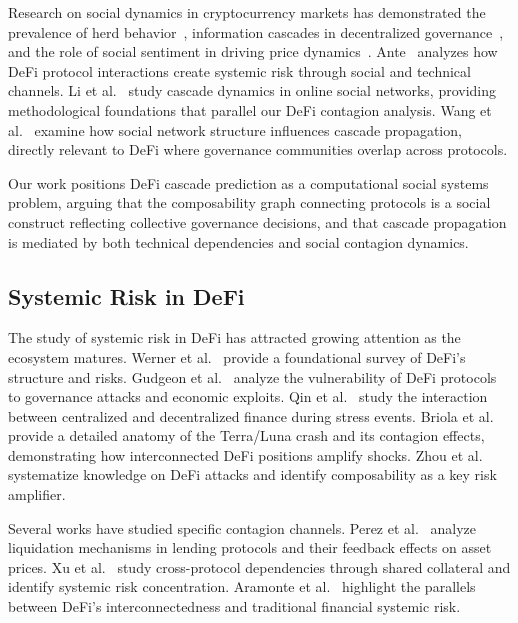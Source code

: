 \documentclass[journal]{IEEEtran}
\begin{document}
Research on social dynamics in cryptocurrency markets has demonstrated the prevalence of herd behavior~\cite{da2022crypto}, information cascades in decentralized governance~\cite{fritsch2022dao}, and the role of social sentiment in driving price dynamics~\cite{chen2023social}.
Ante~\cite{ante2023defi} analyzes how DeFi protocol interactions create systemic risk through social and technical channels.
Li et al.~\cite{li2023cascade} study cascade dynamics in online social networks, providing methodological foundations that parallel our DeFi contagion analysis.
Wang et al.~\cite{wang2022social} examine how social network structure influences cascade propagation, directly relevant to DeFi where governance communities overlap across protocols.

Our work positions DeFi cascade prediction as a computational social systems problem, arguing that the composability graph connecting protocols is a social construct reflecting collective governance decisions, and that cascade propagation is mediated by both technical dependencies and social contagion dynamics.

\subsection{Systemic Risk in DeFi}

The study of systemic risk in DeFi has attracted growing attention as the ecosystem matures.
Werner et al.~\cite{werner2022defi} provide a foundational survey of DeFi's structure and risks.
Gudgeon et al.~\cite{gudgeon2020defi} analyze the vulnerability of DeFi protocols to governance attacks and economic exploits.
Qin et al.~\cite{qin2021cefi} study the interaction between centralized and decentralized finance during stress events.
Briola et al.~\cite{briola2023anatomy} provide a detailed anatomy of the Terra/Luna crash and its contagion effects, demonstrating how interconnected DeFi positions amplify shocks.
Zhou et al.~\cite{zhou2023sok} systematize knowledge on DeFi attacks and identify composability as a key risk amplifier.

Several works have studied specific contagion channels.
Perez et al.~\cite{perez2021liquidations} analyze liquidation mechanisms in lending protocols and their feedback effects on asset prices.
Xu et al.~\cite{xu2023defi} study cross-protocol dependencies through shared collateral and identify systemic risk concentration.
Aramonte et al.~\cite{aramonte2022defi} highlight the parallels between DeFi's interconnectedness and traditional financial systemic risk.
\end{document}
